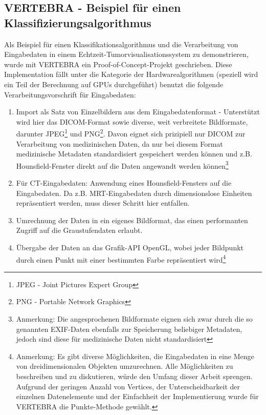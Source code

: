 \documentclass[pdftex,a4paper,titlepage,12pt]{scrartcl}
\newtheorem[L]{boxedDefinition}{Definition}
\begin{document}
\subsection{VERTEBRA - Beispiel für einen Klassifizierungsalgorithmus}\label{ssec:algoexample}
Als Beispiel für einen Klassifikationsalgorithmus und die Verarbeitung von Eingabedaten in einem Echtzeit-Tumorvisualisationssystem zu demonstrieren, wurde mit VERTEBRA ein Proof-of-Concept-Projekt geschrieben. Diese Implementation fällt unter die Kategorie der Hardwarealgorithmen (speziell wird ein Teil der Berechnung auf GPUs durchgeführt) benutzt die folgende Verarbeitungsvorschrift für Eingabedaten:
\begin{enumerate}
 \item Import als Satz von Einzelbildern aus dem Eingabedatenformat - Unterstützt wird hier das DICOM-Format sowie diverse, weit verbreitete Bildformate, darunter JPEG\footnote{JPEG - Joint Pictures Expert Group} und PNG\footnote{PNG - Portable Network Graphics}. Davon eignet sich prizipiell nur DICOM zur Verarbeitung von medizinischen Daten, da nur bei diesem Format medizinische Metadaten standardisiert gespeichert werden können und z.B. Hounsfield-Fenster direkt auf die Daten angewandt werden können\footnote{Anmerkung: Die angesprochenen Bildformate eignen sich zwar durch die so genannten EXIF-Daten ebenfalls zur Speicherung beliebiger Metadaten, jedoch sind diese für medizinische Daten nicht standardisiert}
 \item Für CT-Eingabedaten: Anwendung eines Hounsfield-Fensters auf die Eingabedaten. Da z.B. MRT-Eingabedaten durch dimensionslose Einheiten repräsentiert werden, muss dieser Schritt hier entfallen.
 \item Umrechnung der Daten in ein eigenes Bildformat, das einen performanten Zugriff auf die Graustufendaten erlaubt.
 \item Übergabe der Daten an das Grafik-API OpenGL, wobei jeder Bildpunkt durch einen Punkt mit einer bestimmten Farbe repräsentiert wird\footnote{Anmerkung: Es gibt diverse Möglichkeiten, die Eingabedaten in eine Menge von dreidimensionalen Objekten umzurechnen. Alle Möglichkeiten zu beschreiben und zu diskutieren, würde den Umfang dieser Arbeit sprengen. Aufgrund der geringen Anzahl von Vertices, der Unterscheidbarkeit der einzelnen Datenelemente und der Einfachheit der Implementierung wurde für VERTEBRA die Punkte-Methode gewählt.}

\end{enumerate}
\end{document}
